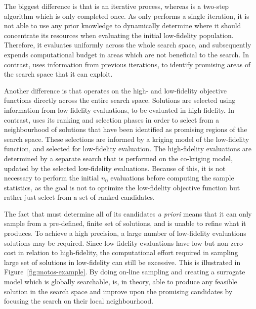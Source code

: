 The biggest difference is that \AlgName{} is an iterative process, whereas \motos{} is a two-step algorithm which is only completed once. As \motos{} only performs a single iteration, it is not able to use any prior knowledge to dynamically determine where it should concentrate its resources when evaluating the initial low-fidelity population. Therefore, it evaluates uniformly across the whole search space, and subsequently expends computational budget in areas which are not beneficial to the search. In contrast, \AlgName{} uses information from previous iterations, to identify promising areas of the search space that it can exploit.

Another difference is that \motos{} operates on the high- and low-fidelity objective functions directly across the entire search space. Solutions are selected using information from low-fidelity evaluations, to be evaluated in high-fidelity. In contrast, \AlgName{} uses its ranking and selection phases in order to select from a neighbourhood of solutions that have been identified as promising regions of the search space. These selections are informed by a kriging model of the low-fidelity function, and selected for low-fidelity evaluation. The high-fidelity evaluations are determined by a separate search that is performed on the co-kriging model, updated by the selected low-fidelity evaluations. Because of this, it is not necessary to perform the initial $n_0$ evaluations before computing the sample statistics, as the goal is not to optimize the low-fidelity objective function but rather just select from a set of ranked candidates.

The fact that \motos{} must determine all of its candidates \emph{a priori} means that it can only sample from a pre-defined, finite set of solutions, and is unable to refine what it produces. To achieve a high precision, a large number of low-fidelity evaluations solutions may be required. Since low-fidelity evaluations have low but non-zero cost in relation to high-fidelity, the computational effort required in sampling large set of solutions in low-fidelity can still be excessive. This is illustrated in Figure~\ref{fig:motos-example}. By doing on-line sampling and creating a surrogate model which is globally searchable, \AlgName{} is, in theory, able to produce any feasible solution in the search space and improve upon the promising candidates by focusing the search on their local neighbourhood.

